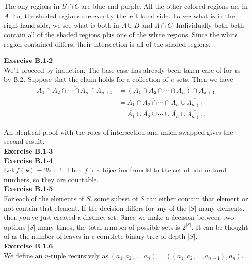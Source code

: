 \documentclass{article}
\begin{document}
The ony regions in $B\cap C$ are blue and purple. All the other colored regions are in $A$. So, the shaded regions are exactly the left hand side. To see what is in the right hand side, we see what is both in $A\cup B$ and $A\cap C$. Individually both both contain all of the shaded regions plus one of the white regions. Since the white region contained differs, their intersection is all of the shaded regions.

\noindent\textbf{Exercise B.1-2}\\

We'll proceed by induction.  The base case has already been taken care of for us by B.2.  Suppose that the claim holds for a collection of $n$ sets.  Then we have 
\begin{align*}
\overline{A_1 \cap A_2 \cap \cdots \cap A_n \cap A_{n+1}} &= \overline{(A_1 \cap A_2 \cap \cdots \cap A_n) \cap A_{n+1}} \\
&= \overline{A_1 \cap A_2 \cap \cdots \cap A_n} \cup \overline{A_{n+1}} \\
&= \overline{A_1} \cup \overline{A_2} \cup \cdots \cup \overline{A_n} \cup \overline{A_{n+1}}.
\end{align*}

An identical proof with the roles of intersection and union swapped gives the second result.\\


\noindent\textbf{Exercise B.1-3}\\

\noindent\textbf{Exercise B.1-4}\\

Let $f(k) = 2k+1$.  Then $f$ is a bijection from $\mathbb{N}$ to the set of odd natural numbers, so they are countable. \\


\noindent\textbf{Exercise B.1-5}\\
For each of the elements of $S$, some subset of $S$ can either contain that element or not contain that element. If the decision differs for any of the $|S|$ many elements, then you've just created a distinct set. Since we make a decision between two options $|S|$ many times, the total number of possible sets is $2^{|S|}$. It can be thought of as the number of leaves in a complete binary tree of depth $|S|$.\\

\noindent\textbf{Exercise B.1-6}\\

We define an $n$-tuple recursively as $(a_1, a_2, \ldots, a_n) = ((a_1, a_2, \ldots, a_{n-1}), a_n)$.\\
\end{document}
